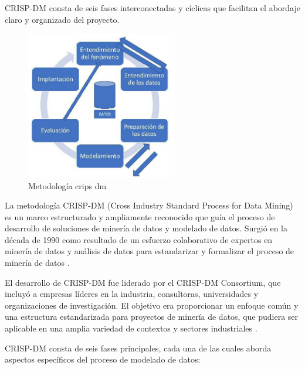 \documentclass[
  11pt,
  bookmarksnumbered]{article}
\begin{document}
CRISP-DM consta de seis fases interconectadas y cíclicas que facilitan el abordaje claro y organizado del proyecto.

\begin{figure}

{\centering \includegraphics[width=2.6in]{Imagenes/Crips-dm} 

}

\caption{Metodología crips dm}\label{fig:unnamed-chunk-5}
\end{figure}

La metodología CRISP-DM (Cross Industry Standard Process for Data Mining) es un marco estructurado y ampliamente reconocido que guía el proceso de desarrollo de soluciones de minería de datos y modelado de datos.
Surgió en la década de 1990 como resultado de un esfuerzo colaborativo de expertos en minería de datos y análisis de datos para estandarizar y formalizar el proceso de minería de datos \textcite{Chapman2000}.

El desarrollo de CRISP-DM fue liderado por el CRISP-DM Consortium, que incluyó a empresas líderes en la industria, consultoras, universidades y organizaciones de investigación.
El objetivo era proporcionar un enfoque común y una estructura estandarizada para proyectos de minería de datos, que pudiera ser aplicable en una amplia variedad de contextos y sectores industriales \textcite{Shearer2000}.

CRISP-DM consta de seis fases principales, cada una de las cuales aborda aspectos específicos del proceso de modelado de datos:
\end{document}
